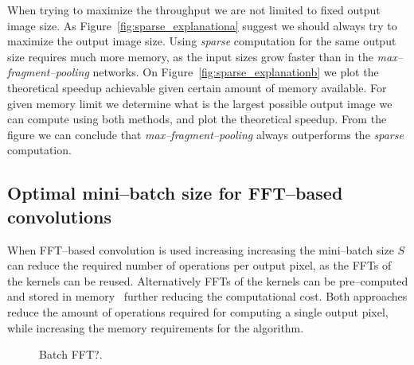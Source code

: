 \documentclass[conference]{IEEEtran}
\begin{document}
  When trying to maximize the throughput we are not limited to fixed
  output image size.  As Figure~\ref{fig:sparse_explanationa} suggest
  we should always try to maximize the output image size.  Using
  \emph{sparse} computation for the same output size requires much
  more memory, as the input sizes grow faster than in the
  \emph{max--fragment--pooling} networks.  On
  Figure~\ref{fig:sparse_explanationb} we plot the theoretical speedup
  achievable given certain amount of memory available.  For given
  memory limit we determine what is the largest possible output image
  we can compute using both methods, and plot the theoretical speedup.
  From the figure we can conclude that \emph{max--fragment--pooling}
  always outperforms the \emph{sparse} computation.

\subsection{Optimal mini--batch size for FFT--based convolutions}

  When FFT--based convolution is used increasing increasing the
  mini--batch size $S$ can reduce the required number of operations
  per output pixel, as the FFTs of the kernels can be reused.
  Alternatively FFTs of the kernels can be pre--computed and stored in
  memory~\cite{zlateski2015znn} further reducing the computational
  cost.  Both approaches reduce the amount of operations required for
  computing a single output pixel, while increasing the memory
  requirements for the algorithm.

  \begin{figure}
    \centering
    \caption{Batch FFT?.}
    \label{fig:fftbatch}
  \end{figure}
\end{document}
